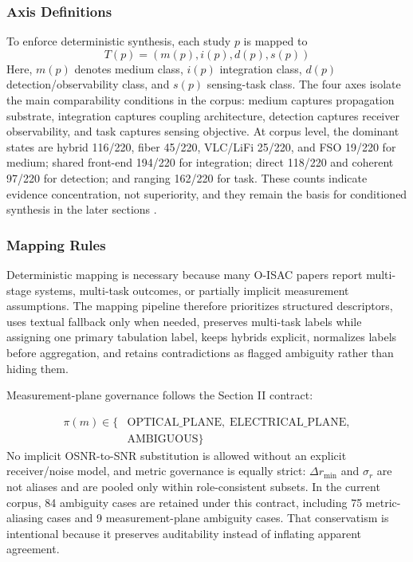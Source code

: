 \documentclass[letterpaper,journal]{IEEEtran}
\begin{document}
\subsubsection{Axis Definitions}
To enforce deterministic synthesis, each study $p$ is mapped to
\begin{equation}
    T(p) = (m(p), i(p), d(p), s(p))
\end{equation}
Here, $m(p)$ denotes medium class, $i(p)$ integration class, $d(p)$ detection/observability class, and $s(p)$ sensing-task class. The four axes isolate the main comparability conditions in the corpus: medium captures propagation substrate, integration captures coupling architecture, detection captures receiver observability, and task captures sensing objective. At corpus level, the dominant states are hybrid 116/220, fiber 45/220, VLC/LiFi 25/220, and FSO 19/220 for medium; shared front-end 194/220 for integration; direct 118/220 and coherent 97/220 for detection; and ranging 162/220 for task. These counts indicate evidence concentration, not superiority, and they remain the basis for conditioned synthesis in the later sections \cite{O_ISAC_021,O_ISAC_039,O_ISAC_077}.

\subsubsection{Mapping Rules}
Deterministic mapping is necessary because many O-ISAC papers report multi-stage systems, multi-task outcomes, or partially implicit measurement assumptions. The mapping pipeline therefore prioritizes structured descriptors, uses textual fallback only when needed, preserves multi-task labels while assigning one primary tabulation label, keeps hybrids explicit, normalizes labels before aggregation, and retains contradictions as flagged ambiguity rather than hiding them.

Measurement-plane governance follows the Section II contract:

\begin{equation}
    \begin{aligned}
        \pi(m)\in\{ & \text{OPTICAL\_PLANE},\;\text{ELECTRICAL\_PLANE}, \\
                    & \text{AMBIGUOUS}\}
    \end{aligned}
\end{equation}
No implicit OSNR-to-SNR substitution is allowed without an explicit receiver/noise model, and metric governance is equally strict: $\Delta r_{\min}$ and $\sigma_r$ are not aliases and are pooled only within role-consistent subsets. In the current corpus, 84 ambiguity cases are retained under this contract, including 75 metric-aliasing cases and 9 measurement-plane ambiguity cases. That conservatism is intentional because it preserves auditability instead of inflating apparent agreement.
\end{document}
